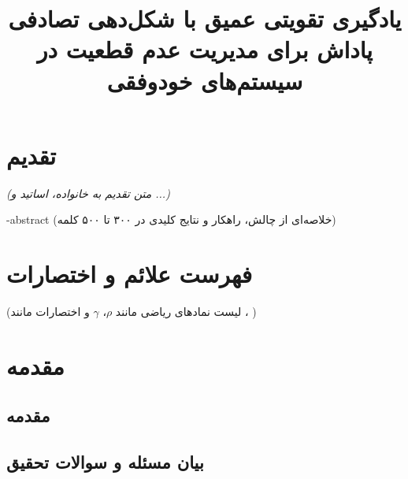 \documentclass[oneside,openany,phd]{TMU-Thesis}
\title{یادگیری تقویتی عمیق با شکل‌دهی تصادفی پاداش برای مدیریت عدم قطعیت در سیستم‌های خودوفقی}
\begin{document}
\AutoPersianDigits
{}

\firstPage
\besmPage
\davaranPage

\esalatPage
\mojavezPage

\chapter*{تقدیم}
\begin{center}
    \textit{(متن تقدیم به خانواده، اساتید و ...)}
\end{center}
\newpage


\fa-abstract{
(خلاصه‌ای از چالش، راهکار و نتایج کلیدی در ۳۰۰ تا ۵۰۰ کلمه)
}
\abstractPage

\tableofcontents
\newpage

\listoftables
\newpage

\listoffigures
\newpage

\chapter*{فهرست علائم و اختصارات}
(لیست نمادهای ریاضی مانند $\rho$، $\gamma$ و اختصارات مانند ، )
\newpage

\pagestyle{fancy}

\chapter{مقدمه}
\section{مقدمه}

\section{بیان مسئله و سوالات تحقیق}
\end{document}
